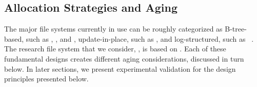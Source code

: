 \begin{comment}
\begin{table}[h]
\begin{center}
    \begin{tabular}{| c | c | r |}
    \hline
    Write Granularity & LBA Pattern & Perf. (MiB/s) \\ \hline
       4KB & Seq. & 266 \\ \hline
       4KB & Rand. & 85 \\ \hline
       2MiB & Seq. & 541 \\ \hline
       2MiB & Rand. & 328 \\ \hline
    \end{tabular}
\end{center}
\caption{SSD read performance comparison.}
\label{table:ssd_read_aging}
\end{table}


\end{comment}




\subsection{Allocation Strategies and Aging}\label{sec:fsa-allocation}

The major file systems currently in use can be roughly  categorized as
B-tree-based, such as \xfs, \zfs, and \btrfs,  update-in-place, such as \ext,
and log-structured, such as \ftwofs~\cite{lee15f2fs}.
The research file system that we consider, \betrfs, is based on \bets.
Each of these fundamental designs creates
different aging considerations, discussed in turn below. 
In later sections,
we present experimental 
validation for the design principles presented below.




